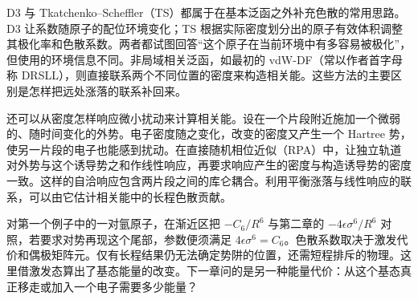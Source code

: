 D3 与 Tkatchenko--Scheffler（TS）都属于在基本泛函之外补充色散的常用思路。D3 让系数随原子的配位环境变化；TS 根据实际密度划分出的原子有效体积调整其极化率和色散系数。两者都试图回答“这个原子在当前环境中有多容易被极化”，但使用的环境信息不同。非局域相关泛函，如最初的 vdW-DF（常以作者首字母称 DRSLL），则直接联系两个不同位置的密度来构造相关能。这些方法的主要区别是怎样把远处涨落的联系补回来。

还可以从密度怎样响应微小扰动来计算相关能。设在一个片段附近施加一个微弱的、随时间变化的外势。电子密度随之变化，改变的密度又产生一个 Hartree 势，使另一片段的电子也能感到扰动。在直接随机相位近似（RPA）中，让独立轨道对外势与这个诱导势之和作线性响应，再要求响应产生的密度与构造诱导势的密度一致。这样的自洽响应包含两片段之间的库仑耦合。利用平衡涨落与线性响应的联系，可以由它估计相关能中的长程色散贡献。

对第一个例子中的一对氩原子，在渐近区把 $-C_6/R^6$ 与第二章的 $-4\epsilon\sigma^6/R^6$ 对照，若要求对势再现这个尾部，参数便须满足 $4\epsilon\sigma^6=C_6$。色散系数取决于激发代价和偶极矩阵元。仅有长程结果仍无法确定势阱的位置，还需短程排斥的物理。这里借激发态算出了基态能量的改变。下一章问的是另一种能量代价：从这个基态真正移走或加入一个电子需要多少能量？
